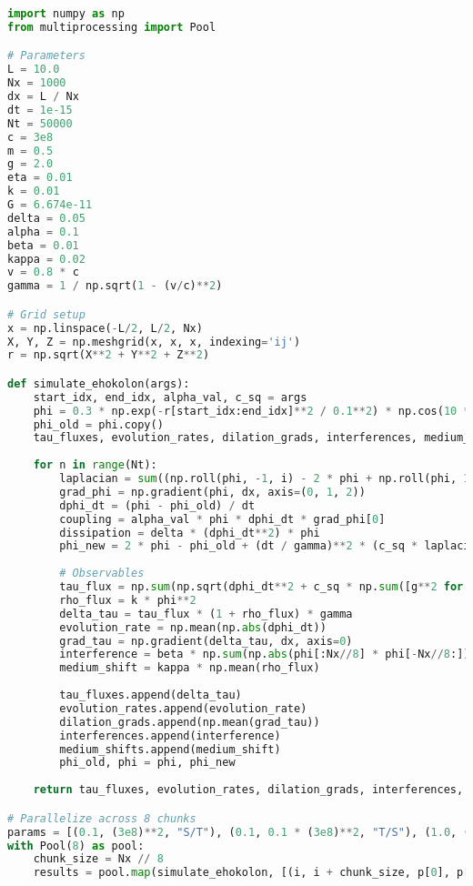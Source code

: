 \documentclass[11pt]{article}
\begin{document}
\begin{lstlisting}[language=Python, caption={Fluxonic Time Dilation Simulation}, label=lst:dilation]
import numpy as np
from multiprocessing import Pool

# Parameters
L = 10.0
Nx = 1000
dx = L / Nx
dt = 1e-15
Nt = 50000
c = 3e8
m = 0.5
g = 2.0
eta = 0.01
k = 0.01
G = 6.674e-11
delta = 0.05
alpha = 0.1
beta = 0.01
kappa = 0.02
v = 0.8 * c
gamma = 1 / np.sqrt(1 - (v/c)**2)

# Grid setup
x = np.linspace(-L/2, L/2, Nx)
X, Y, Z = np.meshgrid(x, x, x, indexing='ij')
r = np.sqrt(X**2 + Y**2 + Z**2)

def simulate_ehokolon(args):
    start_idx, end_idx, alpha_val, c_sq = args
    phi = 0.3 * np.exp(-r[start_idx:end_idx]**2 / 0.1**2) * np.cos(10 * X[start_idx:end_idx]) + 0.1 * np.random.rand(Nx//8, Nx, Nx)
    phi_old = phi.copy()
    tau_fluxes, evolution_rates, dilation_grads, interferences, medium_shifts = [], [], [], [], []
    
    for n in range(Nt):
        laplacian = sum((np.roll(phi, -1, i) - 2 * phi + np.roll(phi, 1, i)) / dx**2 for i in range(3))
        grad_phi = np.gradient(phi, dx, axis=(0, 1, 2))
        dphi_dt = (phi - phi_old) / dt
        coupling = alpha_val * phi * dphi_dt * grad_phi[0]
        dissipation = delta * (dphi_dt**2) * phi
        phi_new = 2 * phi - phi_old + (dt / gamma)**2 * (c_sq * laplacian - m**2 * phi - g * phi**3 - eta * phi**5 + 8 * np.pi * G * k * phi**2 + coupling - dissipation)
        
        # Observables
        tau_flux = np.sum(np.sqrt(dphi_dt**2 + c_sq * np.sum([g**2 for g in grad_phi], axis=0))) * dx**3
        rho_flux = k * phi**2
        delta_tau = tau_flux * (1 + rho_flux) * gamma
        evolution_rate = np.mean(np.abs(dphi_dt))
        grad_tau = np.gradient(delta_tau, dx, axis=0)
        interference = beta * np.sum(np.abs(phi[:Nx//8] * phi[-Nx//8:]))
        medium_shift = kappa * np.mean(rho_flux)
        
        tau_fluxes.append(delta_tau)
        evolution_rates.append(evolution_rate)
        dilation_grads.append(np.mean(grad_tau))
        interferences.append(interference)
        medium_shifts.append(medium_shift)
        phi_old, phi = phi, phi_new
    
    return tau_fluxes, evolution_rates, dilation_grads, interferences, medium_shifts

# Parallelize across 8 chunks
params = [(0.1, (3e8)**2, "S/T"), (0.1, 0.1 * (3e8)**2, "T/S"), (1.0, (3e8)**2, "S=T")]
with Pool(8) as pool:
    chunk_size = Nx // 8
    results = pool.map(simulate_ehokolon, [(i, i + chunk_size, p[0], p[1]) for i in range(0, Nx, chunk_size) for p in params])
\end{lstlisting}
\end{document}
